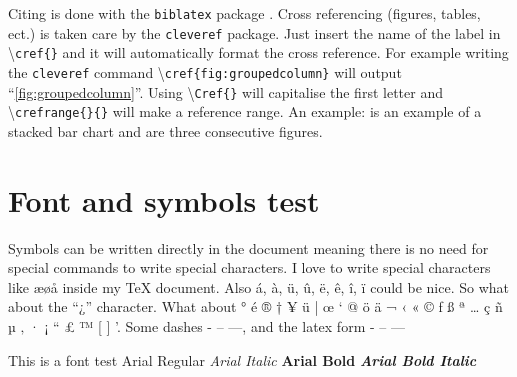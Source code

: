 Citing is done with the \texttt{biblatex} package \cite{biblatex}. Cross referencing (figures, tables, ect.) is taken care by the \texttt{cleveref} package. Just insert the name of the label in \textbackslash \texttt{cref\{\}} and it will automatically format the cross reference. For example writing the \texttt{cleveref} command \textbackslash \texttt{cref\{fig:groupedcolumn\}} will output ``\cref{fig:groupedcolumn}''. Using \textbackslash \texttt{Cref\{\}} will capitalise the first letter and \textbackslash \texttt{crefrange\{\}\{\}} will make a reference range. An example:  is an example of a stacked bar chart and  are three consecutive figures.

\section{Font and symbols test}
Symbols can be written directly in the document meaning there is no need for special commands to write special characters. I love to write special characters like æøå inside my \TeX{} document. Also á, à, ü, û, ë, ê, î, ï could be nice. So what about the ``¿'' character. What about ° é ® † ¥ ü | œ ‘ @ ö ä ¬ ‹ « © ƒ ß ª … ç ñ µ ‚ · ¡ “ £ ™ [ ] '. Some dashes - – —, and the latex form - -- ---

This is a font test \newline
Arial Regular \newline
\textit{Arial Italic} \newline
\textbf{Arial Bold} \newline
\textbf{\textit{Arial Bold Italic}}
